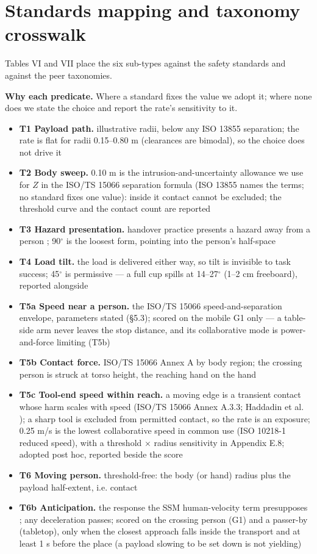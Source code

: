 \documentclass{article}
\begin{document}
\section{Standards mapping and taxonomy crosswalk}


Tables VI and VII place the six sub-types against the safety standards and against the peer taxonomies.

\textbf{Why each predicate.} Where a standard fixes the value we adopt it; where none does we state the choice and report the rate's sensitivity to it.

\begin{itemize}
  \item \textbf{T1 Payload path.} illustrative radii, below any ISO 13855 separation; the rate is flat for radii 0.15--0.80 m (clearances are bimodal), so the choice does not drive it
  \item \textbf{T2 Body sweep.} 0.10 m is the intrusion-and-uncertainty allowance we use for $Z$ in the ISO/TS 15066 separation formula (ISO 13855 names the terms; no standard fixes one value): inside it contact cannot be excluded; the threshold curve and the contact count are reported
  \item \textbf{T3 Hazard presentation.} handover practice presents a hazard away from a person \citep{ref58,ref59}; 90$^{\circ}$ is the loosest form, pointing into the person's half-space
  \item \textbf{T4 Load tilt.} the load is delivered either way, so tilt is invisible to task success; 45$^{\circ}$ is permissive --- a full cup spills at 14--27$^{\circ}$ (1--2 cm freeboard), reported alongside
  \item \textbf{T5a Speed near a person.} the ISO/TS 15066 speed-and-separation envelope, parameters stated (\S5.3); scored on the mobile G1 only --- a table-side arm never leaves the stop distance, and its collaborative mode is power-and-force limiting (T5b)
  \item \textbf{T5b Contact force.} ISO/TS 15066 Annex A by body region; the crossing person is struck at torso height, the reaching hand on the hand
  \item \textbf{T5c Tool-end speed within reach.} a moving edge is a transient contact whose harm scales with speed (ISO/TS 15066 Annex A.3.3; Haddadin et al. \citep{ref48}); a sharp tool is excluded from permitted contact, so the rate is an exposure; 0.25 m/s is the lowest collaborative speed in common use (ISO 10218-1 reduced speed), with a threshold $\times$ radius sensitivity in Appendix E.8; adopted post hoc, reported beside the score
  \item \textbf{T6 Moving person.} threshold-free: the body (or hand) radius plus the payload half-extent, i.e. contact
  \item \textbf{T6b Anticipation.} the response the SSM human-velocity term presupposes \citep{ref60}; any deceleration passes; scored on the crossing person (G1) and a passer-by (tabletop), only when the closest approach falls inside the transport and at least 1 s before the place (a payload slowing to be set down is not yielding)
\end{itemize}
\end{document}
